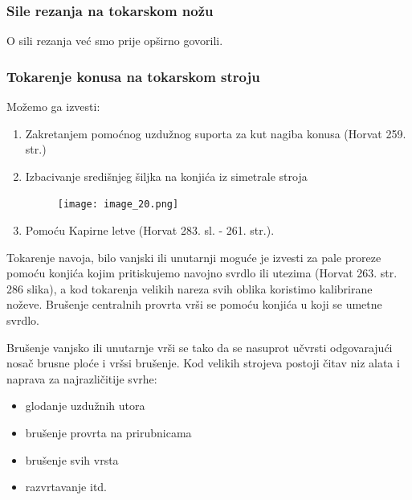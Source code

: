 \documentclass[a4paper,12pt]{article}
\numberwithin{figure}{section}
\begin{document}
\subsubsection{Sile rezanja na tokarskom nožu}
O sili rezanja već smo prije opširno govorili.
\subsubsection{Tokarenje konusa na tokarskom stroju}
Možemo ga izvesti:
\begin{enumerate}
\item Zakretanjem pomoćnog uzdužnog suporta za kut nagiba konusa (Horvat 259. str.)
\item Izbacivanje središnjeg šiljka na konjića iz simetrale stroja
\begin{figure}[!h]
\centering
\texttt{[image: image\_20.png]}
\end{figure}
\FloatBarrier
\item Pomoću Kapirne letve (Horvat 283. sl. - 261. str.).
\end{enumerate}
Tokarenje navoja, bilo vanjski ili unutarnji moguće je izvesti za pale proreze pomoću konjića kojim pritiskujemo navojno svrdlo ili utezima (Horvat 263. str. 286 slika), a kod tokarenja velikih nareza svih oblika koristimo kalibrirane noževe. Brušenje centralnih provrta vrši se pomoću konjića u koji se umetne svrdlo.\par
Brušenje vanjsko ili unutarnje vrši se tako da se nasuprot učvrsti odgovarajući nosač brusne ploće i vršsi brušenje. Kod velikih strojeva postoji čitav niz alata i naprava za najrazličitije svrhe:
\begin{itemize}
\item glodanje uzdužnih utora
\item brušenje provrta na prirubnicama
\item brušenje svih vrsta
\item razvrtavanje itd.
\end{itemize}
\end{document}
